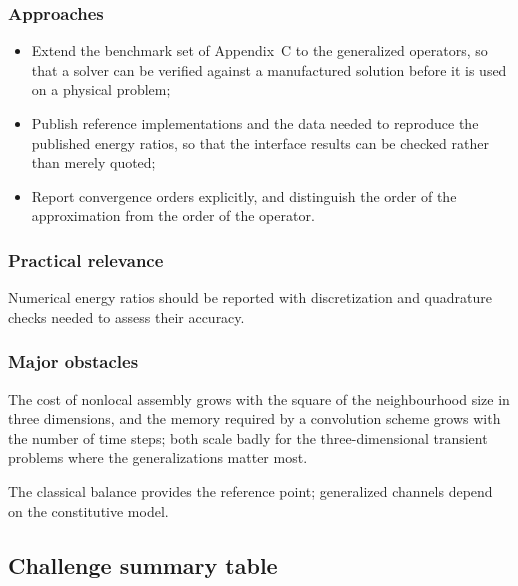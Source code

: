 \subsubsection{Approaches}

\begin{itemize}
\item Extend the benchmark set of Appendix~C to the generalized operators, so that a solver can be verified against a manufactured solution before it is used on a physical problem;
\item Publish reference implementations and the data needed to reproduce the published energy ratios, so that the interface results can be checked rather than merely quoted;
\item Report convergence orders explicitly, and distinguish the order of the approximation from the order of the operator.
\end{itemize}

\subsubsection{Practical relevance}

Numerical energy ratios should be reported with discretization and quadrature checks needed to assess their accuracy.

\subsubsection{Major obstacles}

The cost of nonlocal assembly grows with the square of the neighbourhood size in three dimensions, and the memory required by a convolution scheme grows with the number of time steps; both scale badly for the three-dimensional transient problems where the generalizations matter most.

The classical balance provides the reference point; generalized channels depend on the constitutive model.

\subsection{Challenge summary table}
\label{sec:15.11}

